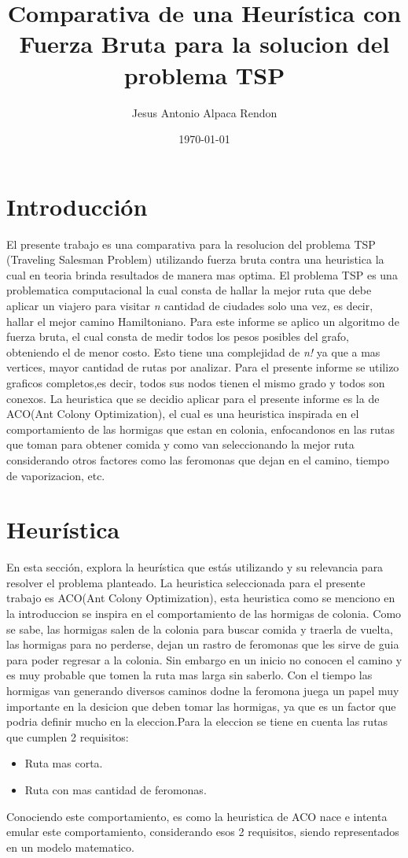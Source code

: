 \documentclass[12pt]{article}
\title{Comparativa de una Heurística con Fuerza Bruta para la solucion del problema TSP}
\author{Jesus Antonio Alpaca Rendon}
\date{\today}
\begin{document}
\maketitle

\section{Introducción}
El presente trabajo es una comparativa para la resolucion del problema
TSP (Traveling Salesman Problem) utilizando fuerza bruta contra una heuristica la cual
en teoria brinda resultados de manera mas optima.
El problema TSP es una problematica computacional la cual consta de hallar la mejor ruta que debe aplicar un viajero para visitar \textit{n} cantidad de ciudades solo una vez,
es decir, hallar el mejor camino Hamiltoniano. Para este informe se aplico un algoritmo de fuerza bruta, el cual consta de medir todos los pesos posibles del grafo, obteniendo el de menor costo.
Esto tiene una complejidad de \textit{n!} ya que a mas vertices, mayor cantidad de rutas por analizar.
Para el presente informe se utilizo graficos completos,es decir, todos sus nodos tienen el mismo grado y todos son conexos.
La heuristica que se decidio aplicar para el presente informe es la de ACO(Ant Colony Optimization), el cual es una heuristica
inspirada en el comportamiento de las hormigas que estan en colonia, enfocandonos en las rutas que toman para obtener comida y como van seleccionando la mejor ruta
considerando otros factores como las feromonas que dejan en el camino, tiempo de vaporizacion, etc.

\section{Heurística}
En esta sección, explora la heurística que estás utilizando y su relevancia para resolver el problema planteado.
La heuristica seleccionada para el presente trabajo es ACO(Ant Colony Optimization), esta heuristica como se menciono en la introduccion se inspira en el comportamiento
de las hormigas de colonia. Como se sabe, las hormigas salen de la colonia para buscar comida y traerla de vuelta, las hormigas para no perderse, dejan un rastro de feromonas
que les sirve de guia para poder regresar a la colonia. Sin embargo en un inicio no conocen el camino y es muy probable que tomen la ruta mas larga sin saberlo.
Con el tiempo las hormigas van generando diversos caminos dodne la feromona juega un papel muy importante en la desicion que deben tomar las hormigas,
ya que es un factor que podria definir mucho en la eleccion.Para la eleccion se tiene en cuenta las rutas que cumplen 2 requisitos:
\begin{itemize}
    \item Ruta mas corta.
    \item Ruta con mas cantidad de feromonas.
\end{itemize}
Conociendo este comportamiento, es como la heuristica de ACO nace e intenta emular este comportamiento, considerando esos 2 requisitos, siendo representados en un modelo matematico.
\end{document}
